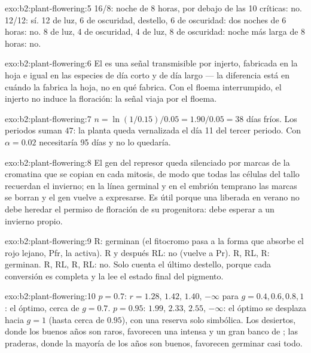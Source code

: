 \begin{solution}{exo:b2:plant-flowering:5}
16/8: noche de 8 horas, por debajo de las 10 críticas: no. 12/12: sí.
12 de luz, 6 de oscuridad, destello, 6 de oscuridad: dos noches de 6
horas: no. 8 de luz, 4 de oscuridad, 4 de luz, 8 de oscuridad: noche más
larga de 8 horas: no.
\end{solution}

\begin{solution}{exo:b2:plant-flowering:6}
El  es una señal transmisible por injerto, fabricada en la hoja e
igual en las especies de día corto y de día largo --- la diferencia está
en cuándo la fabrica la hoja, no en qué fabrica. Con el floema
interrumpido, el injerto no induce la floración: la señal viaja por el
floema.
\end{solution}

\begin{solution}{exo:b2:plant-flowering:7}
$n = \ln(1/0.15)/0.05 = 1.90/0.05 = 38$ días fríos. Los periodos suman
$47$: la planta queda vernalizada el día 11 del tercer periodo. Con
$\alpha = 0.02$ necesitaría 95 días y no lo quedaría.
\end{solution}

\begin{solution}{exo:b2:plant-flowering:8}
El gen del represor queda silenciado por marcas de la cromatina que se
copian en cada mitosis, de modo que todas las células del tallo recuerdan
el invierno; en la línea germinal y en el embrión temprano las marcas se
borran y el gen vuelve a expresarse. Es útil porque una  liberada en
verano no debe heredar el permiso de floración de su progenitora: debe
esperar a un invierno propio.
\end{solution}

\begin{solution}{exo:b2:plant-flowering:9}
R: germinan (el fitocromo pasa a la forma que absorbe el rojo lejano,
Pfr, la activa). R y después RL: no (vuelve a Pr). R, RL, R: germinan. R,
RL, R, RL: no. Solo cuenta el último destello, porque cada conversión es
completa y la  lee el estado final del pigmento.
\end{solution}

\begin{solution}{exo:b2:plant-flowering:10}
$p = 0.7$: $r = 1.28$, $1.42$, $1.40$, $-\infty$ para $g = 0.4, 0.6, 0.8,
1$: el óptimo, cerca de $g = 0.7$. $p = 0.95$: $1.99$, $2.33$, $2.55$,
$-\infty$: el óptimo se desplaza hacia $g = 1$ (hasta cerca de $0.95$), con
una reserva solo simbólica. Los desiertos, donde los buenos años son
raros, favorecen una  intensa y un gran banco de ; las
praderas, donde la mayoría de los años son buenos, favorecen germinar casi
todo.
\end{solution}

